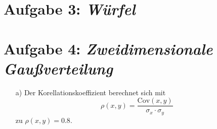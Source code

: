 \section*{Aufgabe 3: \emph{Würfel}}


\section*{Aufgabe 4: \emph{Zweidimensionale Gaußverteilung}}

\begin{itemize}
\item[a)] Der Korellationskoeffizient berechnet sich mit
\begin{equation}
\rho(x,y)=\frac{\text{Cov}(x,y)}{\sigma_x\cdot\sigma_y}
\end{equation}
zu $\rho(x,y)=0.8.$


\end{itemize}
